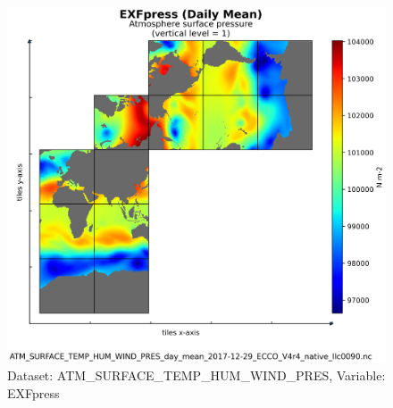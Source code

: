 \begin{figure}[H]
\centering
\includegraphics[scale=0.55]{../images/plots/native_plots/Atmosphere_Surface_Temperature_Humidity_Wind_and_Pressure/EXFpress.png}
\caption{Dataset: ATM\_SURFACE\_TEMP\_HUM\_WIND\_PRES, Variable: EXFpress}
\label{tab:table-ATM_SURFACE_TEMP_HUM_WIND_PRES_EXFpress-Plot}
\end{figure}
\newpage
\pagebreak
